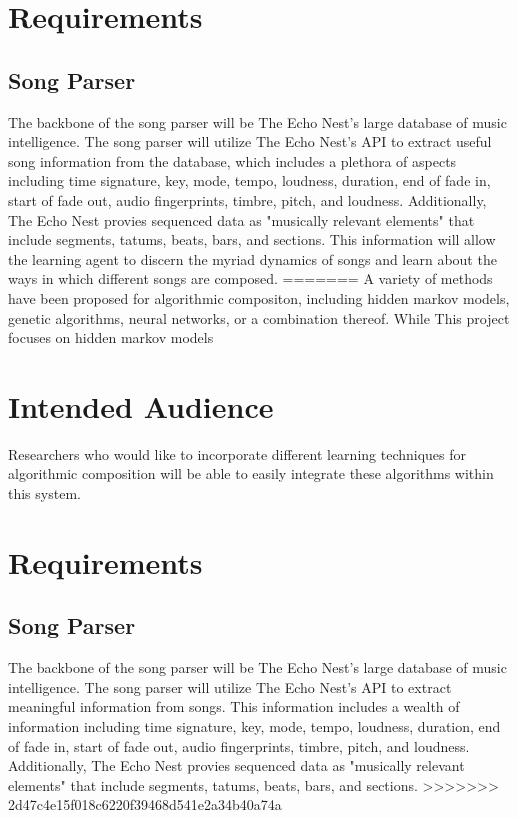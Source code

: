 \documentclass{article}
\begin{document}
\section{Requirements}
\subsection{Song Parser}
The backbone of the song parser will be The Echo Nest's large database of  music intelligence.  The song parser will utilize The Echo Nest's API to extract useful song information from the database, which includes a plethora of aspects including time signature, key, mode, tempo, loudness, duration, end of fade in, start of fade out, audio fingerprints, timbre, pitch, and loudness.  Additionally, The Echo Nest provies sequenced data as "musically relevant elements" that include segments, tatums, beats, bars, and sections. This information will allow the learning agent to discern the myriad dynamics of songs and learn about the ways in which different songs are composed.
=======
A variety of methods have been proposed for algorithmic compositon, including hidden markov models, genetic algorithms, neural networks, or a combination thereof.  While This project focuses on hidden markov models 

\section{Intended Audience}
Researchers who would like to incorporate different learning techniques for algorithmic composition will be able to easily integrate these algorithms within this system.

\section{Requirements}
\subsection{Song Parser}
The backbone of the song parser will be The Echo Nest's large database of music intelligence.  The song parser will utilize The Echo Nest's API to extract meaningful information from songs.  This information includes a wealth of information including time signature, key, mode, tempo, loudness, duration, end of fade in, start of fade out, audio fingerprints, timbre, pitch, and loudness.  Additionally, The Echo Nest provies sequenced data as "musically relevant elements" that include segments, tatums, beats, bars, and sections.
>>>>>>> 2d47c4e15f018c6220f39468d541e2a34b40a74a
\end{document}
